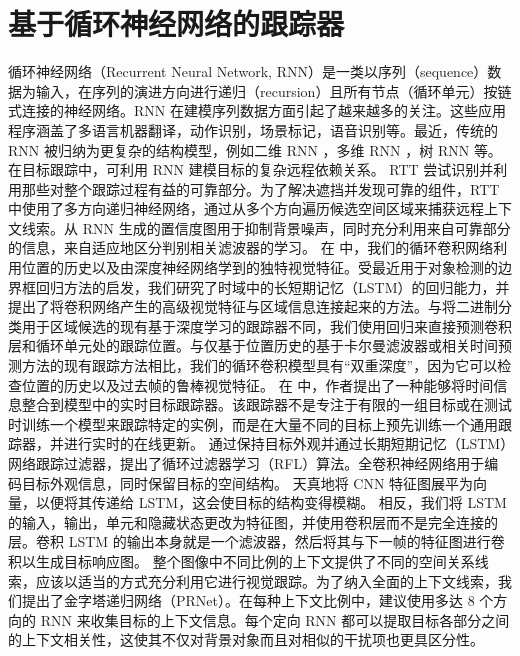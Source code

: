 \section{基于循环神经网络的跟踪器}
循环神经网络（Recurrent Neural Network, RNN）是一类以序列（sequence）数据为输入，在序列的演进方向进行递归（recursion）且所有节点（循环单元）按链式连接的神经网络。RNN 在建模序列数据方面引起了越来越多的关注。这些应用程序涵盖了多语言机器翻译，动作识别，场景标记，语音识别等。最近，传统的 RNN 被归纳为更复杂的结构模型，例如二维 RNN \cite{shuai2015quaddirectional}，多维 RNN \cite{stollenga2015parallel}，树 RNN \cite{tai2015improved} 等。在目标跟踪中，可利用 RNN 建模目标的复杂远程依赖关系。
RTT \cite{RTT} 尝试识别并利用那些对整个跟踪过程有益的可靠部分。为了解决遮挡并发现可靠的组件，RTT 中使用了多方向递归神经网络，通过从多个方向遍历候选空间区域来捕获远程上下文线索。从 RNN 生成的置信度图用于抑制背景噪声，同时充分利用来自可靠部分的信息，来自适应地区分判别相关滤波器的学习。%
在 \cite{SpatiallySupervised} 中，我们的循环卷积网络利用位置的历史以及由深度神经网络学到的独特视觉特征。受最近用于对象检测的边界框回归方法的启发，我们研究了时域中的长短期记忆（LSTM）的回归能力，并提出了将卷积网络产生的高级视觉特征与区域信息连接起来的方法。与将二进制分类用于区域候选的现有基于深度学习的跟踪器不同，我们使用回归来直接预测卷积层和循环单元处的跟踪位置。与仅基于位置历史的基于卡尔曼滤波器或相关时间预测方法的现有跟踪方法相比，我们的循环卷积模型具有“双重深度”，因为它可以检查位置的历史以及过去帧的鲁棒视觉特征。%
在 \cite{gordon2018re} 中，作者提出了一种能够将时间信息整合到模型中的实时目标跟踪器。该跟踪器不是专注于有限的一组目标或在测试时训练一个模型来跟踪特定的实例，而是在大量不同的目标上预先训练一个通用跟踪器，并进行实时的在线更新。%
\cite{RecurrentFilter} 通过保持目标外观并通过长期短期记忆（LSTM）网络跟踪过滤器，提出了循环过滤器学习（RFL）算法。全卷积神经网络用于编码目标外观信息，同时保留目标的空间结构。 天真地将 CNN 特征图展平为向量，以便将其传递给 LSTM，这会使目标的结构变得模糊。 相反，我们将 LSTM 的输入，输出，单元和隐藏状态更改为特征图，并使用卷积层而不是完全连接的层。卷积 LSTM 的输出本身就是一个滤波器，然后将其与下一帧的特征图进行卷积以生成目标响应图。%
\cite{PRNet} 整个图像中不同比例的上下文提供了不同的空间关系线索，应该以适当的方式充分利用它进行视觉跟踪。为了纳入全面的上下文线索，我们提出了金字塔递归网络（PRNet）。在每种上下文比例中，建议使用多达 8 个方向的 RNN 来收集目标的上下文信息。每个定向 RNN 都可以提取目标各部分之间的上下文相关性，这使其不仅对背景对象而且对相似的干扰项也更具区分性。 %
